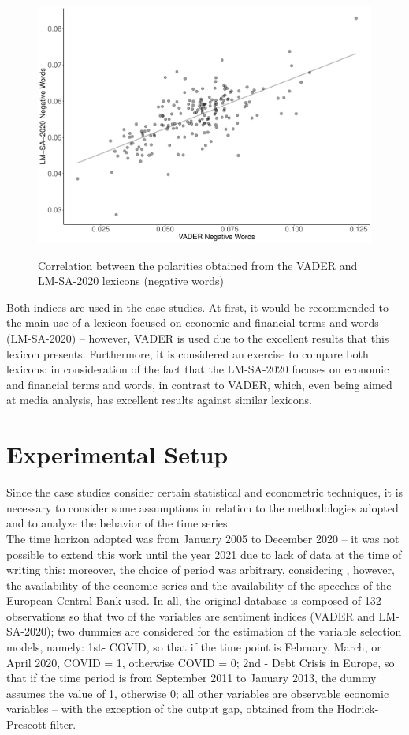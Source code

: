 \begin{figure}[!h]
    \centering
    \caption{Correlation between the polarities obtained from the VADER and LM-SA-2020 lexicons (negative words)}
    \includegraphics[width=.7\textwidth]{images/correlation_vader_lm.pdf}
    \label{fig:correlationvaderlmsa}
\end{figure}

Both indices are used in the case studies. At first, it would be recommended to \cite[p. 62]{loughran2011liability} the main use of a lexicon focused on economic and financial terms and words (LM-SA-2020) -- however, VADER is used due to the excellent results that this lexicon presents. Furthermore, it is considered an exercise to compare both lexicons: in consideration of the fact that the LM-SA-2020 focuses on economic and financial terms and words, in contrast to VADER, which, even being aimed at media analysis, has excellent results against similar lexicons.

\section{Experimental Setup}

Since the case studies consider certain statistical and econometric techniques, it is necessary to consider some assumptions in relation to the methodologies adopted and to analyze the behavior of the time series.\\

The time horizon adopted was from January 2005 to December 2020 -- it was not possible to extend this work until the year 2021 due to lack of data at the time of writing this: moreover, the choice of period was arbitrary, considering , however, the availability of the economic series and the availability of the speeches of the European Central Bank used. In all, the original database is composed of 132 observations so that two of the variables are sentiment indices (VADER and LM-SA-2020); two dummies are considered for the estimation of the variable selection models, namely: 1st- COVID, so that if the time point is February, March, or April 2020, COVID = 1, otherwise COVID = 0; 2nd - Debt Crisis in Europe, so that if the time period is from September 2011 to January 2013, the dummy assumes the value of 1, otherwise 0; all other variables are observable economic variables -- with the exception of the output gap, obtained from the Hodrick-Prescott filter.\\

